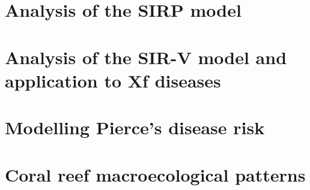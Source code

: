 \documentclass[
	10pt, %
	fleqn, %
	a4paper, %
]{LegrandOrangeBook}
\begin{document}
\begin{appendices}

	\renewcommand{\chaptername}{Appendix}



	\chapterspaceabove{6.75cm}
	\chapterspacebelow{7.25cm}

	\chapter{Analysis of the SIRP model}
	



	\chapterspaceabove{6.75cm}
	\chapterspacebelow{7.25cm}

	\chapter{Analysis of the SIR-V model and application to Xf diseases}
	


	\chapterspaceabove{6.75cm}
	\chapterspacebelow{7.25cm}

	\chapter{Modelling Pierce’s disease risk}
	



	\chapterspaceabove{6.75cm}
	\chapterspacebelow{7.25cm}

	\chapter{Coral reef macroecological patterns}
	


\end{appendices}
\end{document}
